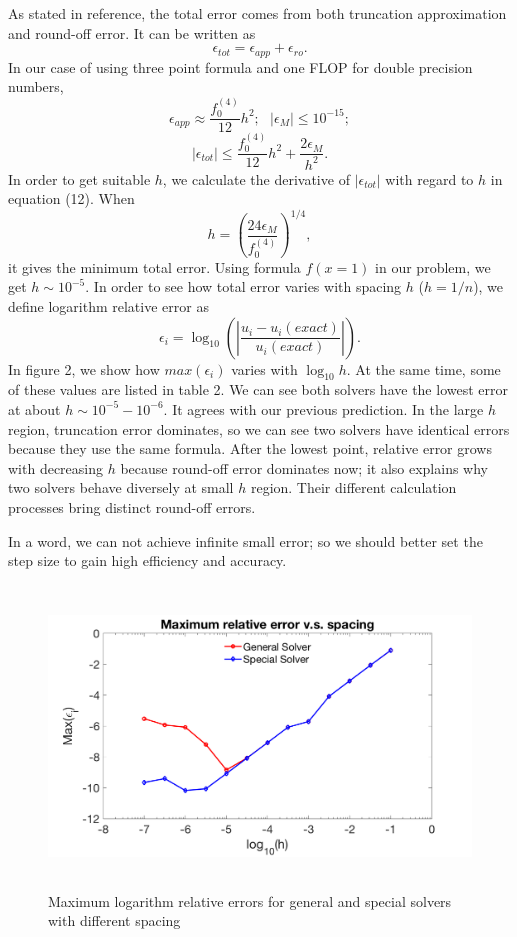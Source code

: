 \documentclass[12pt]{article}
\begin{document}
As stated in reference\cite{morten2}, the total error comes from both truncation approximation and round-off error. It can be written as
\[
\epsilon_{tot} = \epsilon_{app}+\epsilon_{ro}.
\]
In our case of using three point formula and one FLOP for double precision numbers, 
\[
\epsilon_{app} \approx \frac{f_{0}^{(4)}}{12}h^2;\ \ \ 
\left|\epsilon_{M}\right| \le 10^{-15};
\]
\begin{equation}
\left|\epsilon_{tot}\right| \le \frac{f_{0}^{(4)}}{12}h^2 + \frac{2\epsilon_M}{h^2}.
\end{equation}
In order to get suitable $h$, we calculate the derivative of $\left|\epsilon_{tot}\right|$ with regard to $h$ in equation (12). When
\begin{equation}
h = (\frac{24\epsilon_M}{f_{0}^{(4)}})^{1/4},
\end{equation}
it gives the minimum total error. Using formula $f(x=1)$ in our problem, we get $h\sim10^{-5}$. In order to see how total error varies with spacing $h$ ($h=1/n$), we define logarithm relative error as 
\[
\epsilon_i = \log_{10}\left(\left|\frac{u_i-u_i(exact)}{u_i(exact)}\right|\right).
\]
In figure 2, we show how $max(\epsilon_i)$ varies with $\log_{10}h$. At the same time, some of these values are listed in table 2. We can see both solvers have the lowest error at about $h\sim10^{-5}-10^{-6}$. It agrees with our previous prediction. In the large $h$ region, truncation error dominates, so we can see two solvers have identical errors because they use the same formula. After the lowest point, relative error grows with decreasing $h$ because round-off error dominates now; it also explains why two solvers behave diversely at small $h$ region. Their different calculation processes bring distinct round-off errors.  

In a word, we can not achieve infinite small error; so we should better set the step size to gain high efficiency and accuracy.
\begin{figure}[h!]
\centering
\includegraphics[width=14cm,height=8cm]{e.png}
\caption{Maximum logarithm relative errors for general and special solvers with different spacing}
\label{fig:2}
\end{figure}
\end{document}
